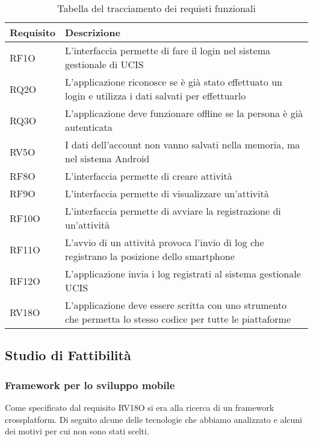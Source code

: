 \renewcommand{\arraystretch}{2}
\begin{longtable}{|p{4cm}|p{10cm}|}%
  \caption{Tabella del tracciamento dei requisti funzionali} 
  \label{tab:requisiti} \\
  
    \hline
    \textbf{Requisito} & \textbf{Descrizione} \\
    \hline
    \endhead
    RF1O     & L'interfaccia permette di fare il login nel sistema gestionale di UCIS \\ \hline
    RQ2O     & L'applicazione riconosce se è già stato effettuato un login e utilizza i dati salvati per effettuarlo \\ \hline
    RQ3O     & L'applicazione deve funzionare offline se la persona è già autenticata \\ \hline
    RV5O     & I dati dell'account non vanno salvati nella memoria, ma nel sistema Android \\ \hline
    RF8O     & L'interfaccia permette di creare attività \\ \hline
    RF9O     & L'interfaccia permette di visualizzare un'attività \\ \hline
    RF10O     & L'interfaccia permette di avviare la registrazione di un'attività \\ \hline
    RF11O     & L'avvio di un attività provoca l'invio di log che registrano la posizione dello smartphone \\ \hline
    RF12O     & L'applicazione invia i log registrati al sistema gestionale UCIS \\ \hline
    RV18O     & L'applicazione deve essere scritta con uno strumento che permetta lo stesso codice per tutte le piattaforme \\ \hline
\end{longtable}%


\subsection{Studio di Fattibilità}
\label{sec:studiodifattibilita}
\subsubsection{Framework per lo sviluppo mobile}
Come specificato dal requisito RV18O si era alla ricerca di un framework crossplatform. Di seguito alcune delle tecnologie che abbiamo analizzato e alcuni dei motivi per
cui non sono stati scelti.

